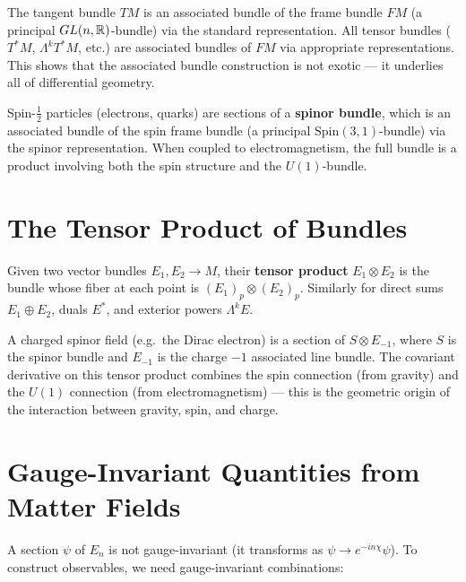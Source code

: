 \begin{example}
The tangent bundle $TM$ is an associated bundle of the frame bundle $FM$ (a principal $GL(n, \mathbb{R})$-bundle) via the standard representation. All tensor bundles ($T^*M$, $\Lambda^k T^*M$, etc.) are associated bundles of $FM$ via appropriate representations. This shows that the associated bundle construction is not exotic --- it underlies all of differential geometry.
\end{example}

\begin{example}
Spin-$\frac{1}{2}$ particles (electrons, quarks) are sections of a \textbf{spinor bundle}, which is an associated bundle of the spin frame bundle (a principal $\mathrm{Spin}(3,1)$-bundle) via the spinor representation. When coupled to electromagnetism, the full bundle is a product involving both the spin structure and the $U(1)$-bundle.
\end{example}

\section{The Tensor Product of Bundles}

\begin{definition}
Given two vector bundles $E_1, E_2 \to M$, their \textbf{tensor product} $E_1 \otimes E_2$ is the bundle whose fiber at each point is $(E_1)_p \otimes (E_2)_p$. Similarly for direct sums $E_1 \oplus E_2$, duals $E^*$, and exterior powers $\Lambda^k E$.
\end{definition}

A charged spinor field (e.g.\ the Dirac electron) is a section of $S \otimes E_{-1}$, where $S$ is the spinor bundle and $E_{-1}$ is the charge $-1$ associated line bundle. The covariant derivative on this tensor product combines the spin connection (from gravity) and the $U(1)$ connection (from electromagnetism) --- this is the geometric origin of the interaction between gravity, spin, and charge.

\section{Gauge-Invariant Quantities from Matter Fields}

A section $\psi$ of $E_n$ is not gauge-invariant (it transforms as $\psi \to e^{-in\chi}\psi$). To construct observables, we need gauge-invariant combinations:

